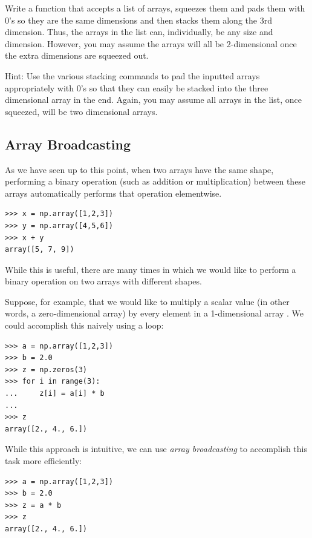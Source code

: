 \begin{problem}
Write a function that accepts a list of arrays, squeezes them and pads them with 0's so they are the same dimensions and then stacks them along the 3rd dimension. 
Thus, the arrays in the list can, individually, be any size and dimension. However, you may assume the arrays will all be 2-dimensional once the extra dimensions are squeezed out.

Hint: Use the various stacking commands to pad the inputted arrays appropriately with 0's so that they can easily be stacked into the three dimensional array in the end. 
Again, you may assume all arrays in the list, once squeezed, will be two dimensional arrays.
\end{problem}

\subsection*{Array Broadcasting} %

As we have seen up to this point, when two arrays have the same shape, performing a binary operation (such as addition or multiplication) between these arrays automatically performs that operation elementwise.

\begin{lstlisting}
>>> x = np.array([1,2,3])
>>> y = np.array([4,5,6])
>>> x + y
array([5, 7, 9])
\end{lstlisting}

While this is useful, there are many times in which we would like to perform a binary operation on two arrays with different shapes. 

Suppose, for example, that we would like to multiply a scalar value  (in other words, a zero-dimensional array) by every element in a 1-dimensional array .
We could accomplish this naively using a loop:

\begin{lstlisting}
>>> a = np.array([1,2,3])
>>> b = 2.0
>>> z = np.zeros(3)
>>> for i in range(3):
...     z[i] = a[i] * b
...
>>> z
array([2., 4., 6.])
\end{lstlisting}

While this approach is intuitive, we can use \emph{array broadcasting} to accomplish this task more efficiently:

\begin{lstlisting}
>>> a = np.array([1,2,3])
>>> b = 2.0
>>> z = a * b
>>> z
array([2., 4., 6.])
\end{lstlisting}

